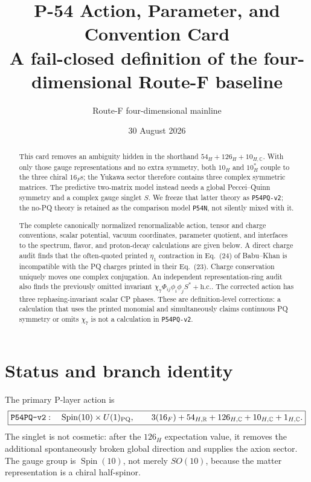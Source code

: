 \documentclass[11pt]{article}
\title{P-54 Action, Parameter, and Convention Card\\
\large A fail-closed definition of the four-dimensional Route-F baseline}
\author{Route-F four-dimensional mainline}
\date{30 August 2026}
\newcommand{\Spin}{\operatorname{Spin}}
\newcommand{\hc}{\mathrm{h.c.}}
\begin{document}
\maketitle

\begin{abstract}
This card removes an ambiguity hidden in the shorthand
$54_H+126_H+10_{H,\mathbb C}$.  With only those gauge representations and no
extra symmetry, both $10_H$ and $10_H^*$ couple to the three chiral $16_F$s;
the Yukawa sector therefore contains three complex symmetric matrices.  The
predictive two-matrix model instead needs a global Peccei--Quinn symmetry and
a complex gauge singlet $S$.  We freeze that latter theory as
\texttt{P54PQ-v2}; the no-PQ theory is retained as the comparison model
\texttt{P54N}, not silently mixed with it.

The complete canonically normalized renormalizable action, tensor and charge
conventions, scalar potential, vacuum coordinates, parameter quotient, and
interfaces to the spectrum, flavor, and proton-decay calculations are given
below.  A direct charge audit finds that the often-quoted printed $\eta_1$
contraction in Eq.~(24) of Babu--Khan is incompatible with the PQ charges
printed in their Eq.~(23).  Charge conservation uniquely moves one complex
conjugation.  An independent representation-ring audit also finds the
previously omitted invariant
$\chi_7\Phi_{ij}\phi_i\phi_jS^*+\hc$.  The corrected action has three
rephasing-invariant scalar CP phases.  These are definition-level corrections: a calculation that
uses the printed monomial and simultaneously claims continuous PQ symmetry
or omits $\chi_7$ is not a calculation in \texttt{P54PQ-v2}.
\end{abstract}

\tableofcontents

\section{Status and branch identity}

The primary P-layer action is
\begin{equation}
 \boxed{\texttt{P54PQ-v2}:\quad
 \Spin(10)\times U(1)_{\rm PQ},\qquad
 3(16_F)+54_{H,\mathbb R}+126_{H,\mathbb C}
 +10_{H,\mathbb C}+1_{H,\mathbb C}.}
 \label{eq:model}
\end{equation}
The singlet is not cosmetic: after the $126_H$ expectation value, it removes
the additional spontaneously broken global direction and supplies the axion
sector.  The gauge group is $\Spin(10)$, not merely $SO(10)$, because the
matter representation is a chiral half-spinor.
\end{document}
